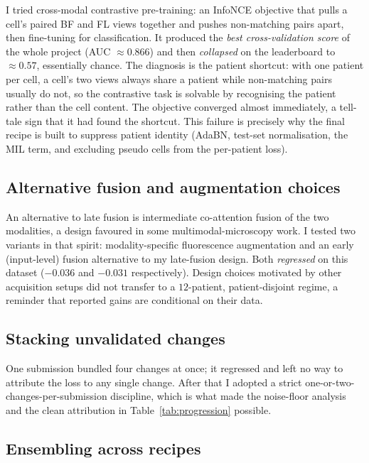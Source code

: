 \documentclass[11pt]{article}
\begin{document}
I tried cross-modal contrastive pre-training: an InfoNCE objective that pulls a cell's paired BF and FL
views together and pushes non-matching pairs apart, then fine-tuning for classification. It produced the
\emph{best cross-validation score} of the whole project (AUC $\approx0.866$) and then \emph{collapsed} on
the leaderboard to $\approx0.57$, essentially chance. The diagnosis is the patient shortcut: with one
patient per cell, a cell's two views always share a patient while non-matching pairs usually do not, so
the contrastive task is solvable by recognising the patient rather than the cell content. The objective
converged almost immediately, a tell-tale sign that it had found the shortcut. This failure is precisely
why the final recipe is built to suppress patient identity (AdaBN, test-set normalisation, the MIL term,
and excluding pseudo cells from the per-patient loss).

\subsection{Alternative fusion and augmentation choices}

An alternative to late fusion is intermediate co-attention fusion of the two modalities, a design
favoured in some multimodal-microscopy work. I tested two variants in that spirit: modality-specific
fluorescence augmentation and an early (input-level) fusion alternative to my late-fusion design. Both
\emph{regressed} on this dataset ($-0.036$ and $-0.031$ respectively). Design choices motivated by other
acquisition setups did not transfer to a $12$-patient, patient-disjoint regime, a reminder that reported
gains are conditional on their data.

\subsection{Stacking unvalidated changes}

One submission bundled four changes at once; it regressed and left no way to attribute the loss to any
single change. After that I adopted a strict one-or-two-changes-per-submission discipline, which is what
made the noise-floor analysis and the clean attribution in Table~\ref{tab:progression} possible.

\subsection{Ensembling across recipes}
\end{document}
